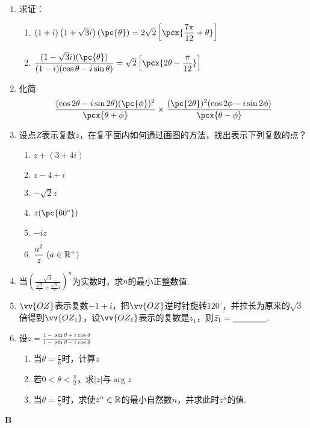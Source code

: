 \begin{enumerate}
\item 求证： 
\begin{enumerate}[(1)]
    \item $(1+i)\left(1+\sqrt{3}i\right)(\pc{\theta})=2\sqrt{2}\left[\pcx{\frac{7\pi}{12}+\theta}\right]$
    \item $\frac{(1-\sqrt{3}i)(\pc{\theta})}{(1-i)(\cos\theta-i \sin\theta)}=\sqrt{2}\left[\pcx{2\theta-\frac{\pi}{12}}\right]$
\end{enumerate}

\item 化简
\[\frac{(\cos2\theta-i\sin2\theta)(\pc{\phi})^2}{\pcx{\theta+\phi}}\x \frac{(\pc{2\theta})^2(\cos2\phi-i\sin2\phi)}{\pcx{\theta-\phi}}\]
\item 设点$Z$表示复数$z$，在复平面内如何通过画图的方法，找出表示下列复数的点？
\begin{multicols}{2}
\begin{enumerate}[(1)]
    \item $z+(3+4i)$
    \item $z-4+i$
    \item $-\sqrt{2}z$
    \item $z(\pc{60^{\circ}})$
    \item $-iz$
    \item $\dfrac{a^2}{z}\; (a\in\mathbb{R}^+)$
\end{enumerate}
\end{multicols}

\item 当$\left(\frac{\sqrt{3}}{\frac{\sqrt{3}}{2}+\frac{\sqrt{3}}{2}i}\right)^n$为实数时，求$n$的最小正整数值.
\item $\vv{OZ}$表示复数$-1+i$，把$\vv{OZ}$逆时针旋转$120^{\circ}$，并拉长为原来的$\sqrt{3}$倍得到$\vv{OZ_1}$，设$\vv{OZ_1}$表示的复数是$z_1$，则$\bar z_1=\underline{\qquad}\underline{\qquad}$.

\item 设$z=\frac{1-\sin\theta+i\cos\theta}{1-\sin\theta-i\cos\theta}$
\begin{enumerate}[(1)]
    \item 当$\theta=\frac{\pi}{6}$时，计算$z$
    \item 若$0<\theta<\frac{\pi}{2}$，求$|z|$与$\arg z$
    \item 当$\theta=\frac{\pi}{5}$时，求使$z^n\in\mathbb{R}$的最小自然数$n$，并求此时$z^n$的值.
\end{enumerate}

\end{enumerate}

\begin{center}
    \bfseries B
\end{center}


